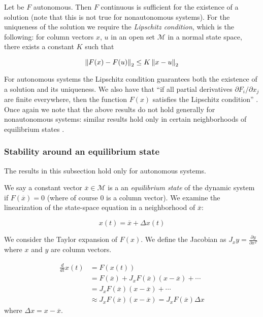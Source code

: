 Let be $F$ autonomous. Then $F$ continuous is sufficient for the existence of a solution (note that this is not true for nonautonomous systems). For the uniqueness of the solution we require the \emph{Lipschitz condition}, which is the following: for column vectors $x$, $u$ in an open set $\mathcal{M}$ in a normal state space, there exists a constant $K$ such that

\begin{equation*}
\left\lVert F(x) - F(u) \right\rVert_2 \leq K\left\lVert x - u \right\rVert_2
\end{equation*}

For autonomous systems the Lipschitz condition guarantees both the existence of a solution and its uniqueness. We also have that ``if all partial derivatives $\partial F_i / \partial x_j$ are finite everywhere, then the function $F(x)$ satisfies the Lipschitz condition'' \cite[p. 677]{Haykin:2009:NNC:1213811}. Once again we note that the above results do not hold generally for nonautonomous systems: similar results hold only in certain neighborhoods of equilibrium states \cite[Definition A.2, p. 194]{rasmussen2006attractivity}.

\subsubsection{Stability around an equilibrium state}

The results in this subsection hold only for autonomous systems.

We say a constant vector $\overline{x} \in \mathcal{M}$ is a an \emph{equilibrium state} of the dynamic system if $F(\overline{x}) = 0$ (where of course 0 is a column vector). We examine the linearization of the state-space equation in a neighborhood of $\overline{x}$:

\begin{equation*}
x(t) = \overline{x} + \Delta x(t)
\end{equation*}

We consider the Taylor expansion of $F(x)$. We define the Jacobian as $J_xy = \frac{\partial y}{\partial x^T}$ where $x$ and $y$ are column vectors.

\begin{align*}
  \frac{d}{dt}x(t) & = F(x(t)) \\
  & = F(\overline{x}) + J_x F(\overline{x})(x - \overline{x}) + \cdots \\
  & = J_x F(\overline{x})(x - \overline{x}) + \cdots \\
  & \approx J_x F(\overline{x})(x - \overline{x}) = J_x F(\overline{x}) \Delta x
\end{align*}
%
where $\Delta x = x - \overline{x}$.

